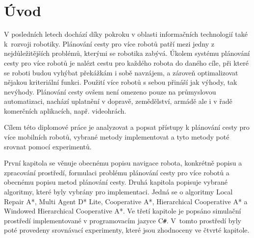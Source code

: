 \cleardoublepage
\chapter*{Úvod}


V posledních letech dochází díky pokroku v oblasti informačních technologií také k~rozvoji robotiky. Plánování cesty pro více robotů patří mezi jedny z nejdůležitějších problémů, kterými se robotika zabývá. Úkolem systému plánování cesty pro více robotů je nalézt cestu pro každého robota do daného cíle, při které se roboti budou vyhýbat překážkám i sobě navzájem, a zároveň optimalizovat nějakou kriteriální funkci. Použití více robotů s sebou přináší jak výhody, tak nevýhody. Plánování cesty
ovšem není omezeno pouze na průmyslovou automatizaci, nachází uplatnění v dopravě, zemědělství, armádě ale i v řadě komerčních aplikacích, např. videohrách.

Cílem této diplomové práce je analyzovat a popsat přístupy k plánování cesty pro více mobilních robotů, vybrané metody implementovat a tyto metody poté srovnat pomocí experimentů.

První kapitola se věnuje obecnému popisu navigace robota, konkrétně popisu a zpracování prostředí, formulaci problému plánování cesty pro více robotů a obecnému popisu metod plánování cesty. Druhá kapitola popisuje vybrané algoritmy, které byly vybrány pro implementaci. Jedná se o algoritmy Local Repair A*, Multi Agent D* Lite, Cooperative A*, Hierarchical Cooperative A* a Windowed Hierarchical Cooperative A*. Ve třetí kapitole je popsáno simulační prostředí implementované v programovacím jazyce C\texttt{\#}. V~tomto prostředí byly poté provedeny srovnávací experimenty, které jsou zhodnoceny ve čtvrté kapitole.